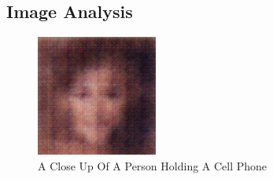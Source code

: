 \documentclass{article}%
\begin{document}
%
\subsection{Image Analysis}%
\label{subsec:ImageAnalysis}%


\begin{figure}[h!]%
\centering%
\includegraphics[width=150px]{500_fake_images/samples_5_424.png}%
\caption{A Close Up Of A Person Holding A Cell Phone}%
\end{figure}

%
\end{document}
